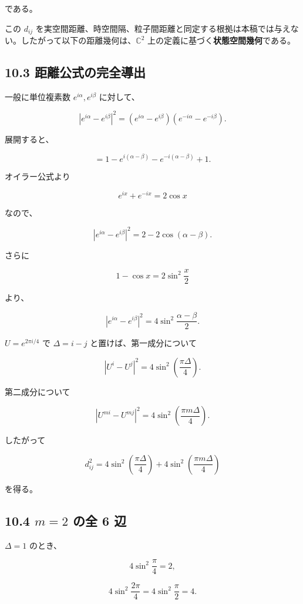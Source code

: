 \documentclass[
  a4paper,
]{ltjsarticle}
\begin{document}
である。

この \(d_{ij}\)
を実空間距離、時空間隔、粒子間距離と同定する根拠は本稿では与えない。したがって以下の距離幾何は、\(\mathbb C^2\)
上の定義に基づく\textbf{状態空間幾何}である。

\subsection{10.3
距離公式の完全導出}\label{ux8dddux96e2ux516cux5f0fux306eux5b8cux5168ux5c0eux51fa}

一般に単位複素数 \(e^{i\alpha},e^{i\beta}\) に対して、

\[
|e^{i\alpha}-e^{i\beta}|^2
=
(e^{i\alpha}-e^{i\beta})(e^{-i\alpha}-e^{-i\beta}).
\]

展開すると、

\[
=
1-e^{i(\alpha-\beta)}-e^{-i(\alpha-\beta)}+1.
\]

オイラー公式より

\[
e^{ix}+e^{-ix}=2\cos x
\]

なので、

\[
|e^{i\alpha}-e^{i\beta}|^2
=
2-2\cos(\alpha-\beta).
\]

さらに

\[
1-\cos x
=
2\sin^2\frac{x}{2}
\]

より、

\[
|e^{i\alpha}-e^{i\beta}|^2
=
4\sin^2\frac{\alpha-\beta}{2}.
\]

\(U=e^{2\pi i/4}\) で \(\Delta=i-j\) と置けば、第一成分について

\[
|U^i-U^j|^2
=
4\sin^2\left(\frac{\pi\Delta}{4}\right).
\]

第二成分について

\[
|U^{mi}-U^{mj}|^2
=
4\sin^2\left(\frac{\pi m\Delta}{4}\right).
\]

したがって

\[
\boxed{
d_{ij}^2
=
4\sin^2\left(\frac{\pi\Delta}{4}\right)
+
4\sin^2\left(\frac{\pi m\Delta}{4}\right)
}
\]

を得る。

\subsection{\texorpdfstring{10.4 \(m=2\) の全 6
辺}{10.4 m=2 の全 6 辺}}\label{m2-ux306eux5168-6-ux8fba}

\(\Delta=1\) のとき、

\[
4\sin^2\frac{\pi}{4}=2,
\]

\[
4\sin^2\frac{2\pi}{4}
=
4\sin^2\frac{\pi}{2}
=4.
\]
\end{document}

